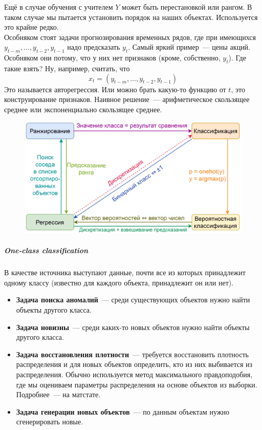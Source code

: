\documentclass{article}
\begin{document}
    Ещё в случае обучения с учителем $Y$ может быть перестановкой или рангом. В таком случае мы пытается установить порядок на наших объектах. Используется это крайне редко.\\
    Особняком стоят задачи прогнозирования временных рядов, где при имеющихся $y_{t-m},\ldots,y_{t-2},y_{t-1}$ надо предсказать $y_t$. Самый яркий пример~--- цены акций. Особняком они потому, что у них нет признаков (кроме, собственно, $y_t$). Где такие взять? Ну, например, считать, что
    \[
    x_t=(y_{t-m},\ldots,y_{t-2},y_{t-1})
    \]
    Это называется авторегрессия. Или можно брать какую-то функцию от $t$, это конструирование признаков. Наивное решение~--- арифметическое скользящее среднее или экспоненциально скользящее среднее.
    \begin{figure}[H]
        \includegraphics[width=0.8\linewidth]{Images/Supervised-learning-problem-convertions}
    \end{figure}\noindent
    \subparagraph{One-class classification}
    В качестве источника выступают данные, почти все из которых принадлежит одному классу (известно для каждого объекта, принадлежит он или нет).
    \begin{itemize}
        \item \textbf{Задача поиска аномалий}~--- среди существующих объектов нужно найти объекты другого класса.
        \item \textbf{Задача новизны}~--- среди каких-то новых объектов нужно найти объекты другого класса.
        \item \textbf{Задача восстановления плотности}~--- требуется восстановить плотность распределения и для новых объектов определить, кто из них выбивается из распределения. Обычно используется метод максимального правдоподобия, где мы оцениваем параметры распределения на основе объектов из выборки. Подробнее~--- на матстате.
        \item \textbf{Задача генерации новых объектов}~--- по данным объектам нужно сгенерировать новые.
    \end{itemize}
\end{document}
